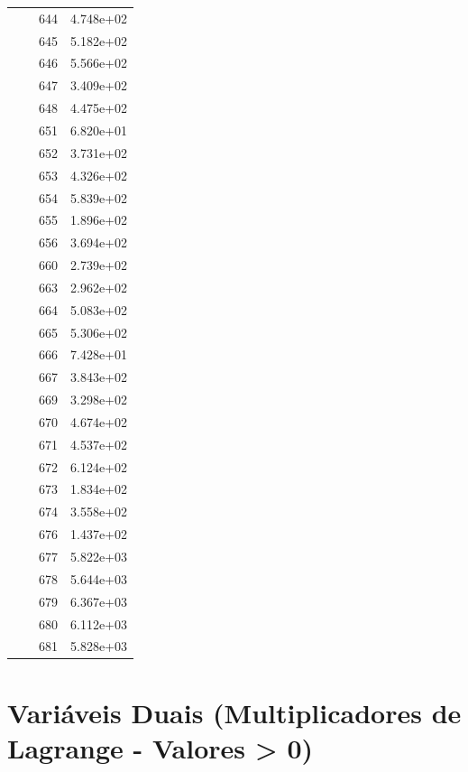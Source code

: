 \documentclass[12pt]{article}
\begin{document}
\begin{longtable}{@{}cccc@{}}
 &  & 644 & 4.748e+02 \\
 &  & 645 & 5.182e+02 \\
 &  & 646 & 5.566e+02 \\
 &  & 647 & 3.409e+02 \\
 &  & 648 & 4.475e+02 \\
 &  & 651 & 6.820e+01 \\
 &  & 652 & 3.731e+02 \\
 &  & 653 & 4.326e+02 \\
 &  & 654 & 5.839e+02 \\
 &  & 655 & 1.896e+02 \\
 &  & 656 & 3.694e+02 \\
 &  & 660 & 2.739e+02 \\
 &  & 663 & 2.962e+02 \\
 &  & 664 & 5.083e+02 \\
 &  & 665 & 5.306e+02 \\
 &  & 666 & 7.428e+01 \\
 &  & 667 & 3.843e+02 \\
 &  & 669 & 3.298e+02 \\
 &  & 670 & 4.674e+02 \\
 &  & 671 & 4.537e+02 \\
 &  & 672 & 6.124e+02 \\
 &  & 673 & 1.834e+02 \\
 &  & 674 & 3.558e+02 \\
 &  & 676 & 1.437e+02 \\
 &  & 677 & 5.822e+03 \\
 &  & 678 & 5.644e+03 \\
 &  & 679 & 6.367e+03 \\
 &  & 680 & 6.112e+03 \\
 &  & 681 & 5.828e+03 \\

\bottomrule
\end{longtable}


\section{Variáveis Duais (Multiplicadores de Lagrange - Valores > 0)}
\end{document}

